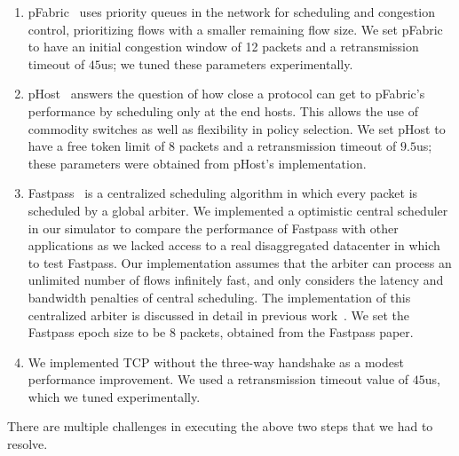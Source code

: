 \begin{enumerate}
\item {} pFabric~\cite{pfabric} uses priority queues in the network for scheduling and congestion control, prioritizing flows with a smaller remaining flow size. We set pFabric to have an initial congestion window of 12 packets  and a retransmission timeout of $45$us; we tuned these parameters experimentally.
%
\item {} pHost~\cite{phost} answers the question of how close a protocol can get to pFabric's performance by scheduling only at the end hosts. This allows the use of commodity switches as well as flexibility in policy selection. We set pHost to have a free token limit of 8 packets and a retransmission timeout of $9.5$us; these parameters were obtained from pHost's implementation.
%
\item {} Fastpass~\cite{fastpass} is a centralized scheduling algorithm in which every packet is scheduled by a global arbiter. We implemented a optimistic central scheduler in our simulator to compare the performance of Fastpass with other applications as we lacked access to a real disaggregated datacenter in which to test Fastpass. Our implementation assumes that the arbiter can process an unlimited number of flows infinitely fast, and only considers the latency and bandwidth penalties of central scheduling. The implementation of this centralized arbiter is discussed in detail in previous work~\cite{phost}. We set the Fastpass epoch size to be 8 packets, obtained from the Fastpass paper.
%
\item {} We implemented TCP without the three-way handshake as a modest performance improvement. We used a retransmission timeout value of $45$us, which we tuned experimentally.
\end{enumerate}

There are multiple challenges in executing the above two steps that we had to resolve.

